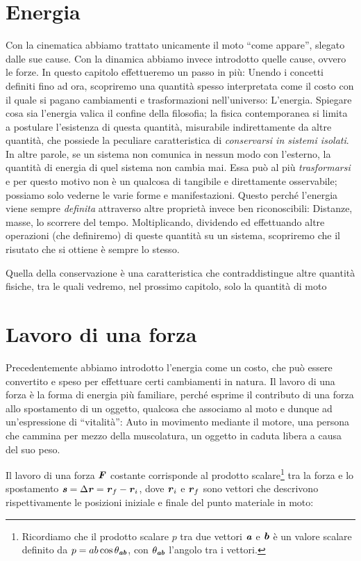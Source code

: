 \marginpar{\minitoc}

\section{Energia}
Con la cinematica abbiamo trattato unicamente il moto ``come appare'', slegato
dalle sue cause. Con la dinamica abbiamo invece introdotto quelle cause, ovvero le
forze. In questo capitolo effettueremo un passo in più: Unendo
i concetti definiti fino ad ora, scopriremo una quantità spesso
interpretata come il costo con il quale si pagano cambiamenti e trasformazioni
nell'universo: L'energia. Spiegare cosa sia l'energia valica il confine della
filosofia; la fisica contemporanea si limita a postulare l'esistenza di questa
quantità, misurabile indirettamente da altre quantità, che possiede la peculiare
caratteristica di \textit{conservarsi in sistemi isolati}. In altre parole, se un
sistema non comunica in nessun modo con l'esterno, la quantità di energia di
quel sistema non cambia mai. Essa può al più \textit{trasformarsi} e per questo
motivo non è un qualcosa di tangibile e direttamente osservabile; possiamo solo
vederne le varie forme e manifestazioni. Questo perché l'energia viene sempre
\textit{definita} attraverso altre proprietà invece ben riconoscibili: Distanze,
masse, lo scorrere del tempo. Moltiplicando, dividendo ed effettuando altre
operazioni (che definiremo) di queste quantità su un sistema, scopriremo che
il risutato che si ottiene è sempre lo stesso.

Quella della conservazione è una caratteristica che contraddistingue altre
quantità fisiche, tra le quali vedremo, nel prossimo capitolo, solo la quantità di moto


\section{Lavoro di una forza}
Precedentemente abbiamo introdotto
l'energia come un costo, che può essere convertito e speso per effettuare certi
cambiamenti in natura. Il lavoro di una forza è la forma di energia più familiare,
perché esprime il contributo di una forza allo spostamento di un oggetto, qualcosa
che associamo al moto e dunque ad un'espressione di ``vitalità'': Auto in movimento
mediante il motore,
una persona che cammina per mezzo della muscolatura, un oggetto in caduta libera a
causa del suo peso.

Il lavoro di una forza $\textbf{\textit{F}}$ costante corrisponde al prodotto scalare\footnote{Ricordiamo
che il prodotto scalare $p$ tra due vettori $\textbf{\textit{a}}$ e $\textbf{\textit{b}}$ è un valore scalare
definito da $p = ab\cos\theta_{\textbf{\textit{ab}}}$, con $\theta_{\textbf{\textit{ab}}}$
l'angolo tra i vettori.}
tra la forza e lo spostamento $\textbf{\textit{s}} = \Delta\textbf{\textit{r}} = \textbf{\textit{r}}_f - \textbf{\textit{r}}_i$,
dove $\textbf{\textit{r}}_i$ e $\textbf{\textit{r}}_f$ sono vettori che descrivono rispettivamente
le posizioni iniziale e finale del punto materiale in moto:

